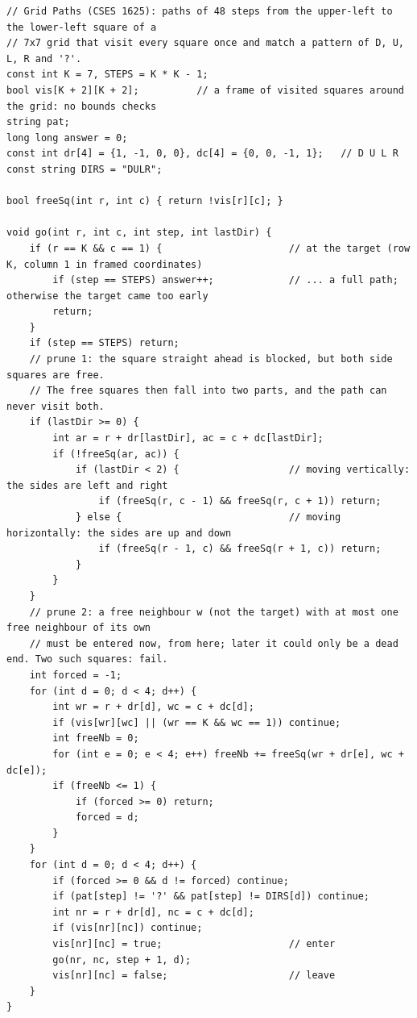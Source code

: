 \begin{solutionbox}
\begin{lstlisting}[style=cpp]
// Grid Paths (CSES 1625): paths of 48 steps from the upper-left to the lower-left square of a
// 7x7 grid that visit every square once and match a pattern of D, U, L, R and '?'.
const int K = 7, STEPS = K * K - 1;
bool vis[K + 2][K + 2];          // a frame of visited squares around the grid: no bounds checks
string pat;
long long answer = 0;
const int dr[4] = {1, -1, 0, 0}, dc[4] = {0, 0, -1, 1};   // D U L R
const string DIRS = "DULR";

bool freeSq(int r, int c) { return !vis[r][c]; }

void go(int r, int c, int step, int lastDir) {
    if (r == K && c == 1) {                      // at the target (row K, column 1 in framed coordinates)
        if (step == STEPS) answer++;             // ... a full path; otherwise the target came too early
        return;
    }
    if (step == STEPS) return;
    // prune 1: the square straight ahead is blocked, but both side squares are free.
    // The free squares then fall into two parts, and the path can never visit both.
    if (lastDir >= 0) {
        int ar = r + dr[lastDir], ac = c + dc[lastDir];
        if (!freeSq(ar, ac)) {
            if (lastDir < 2) {                   // moving vertically: the sides are left and right
                if (freeSq(r, c - 1) && freeSq(r, c + 1)) return;
            } else {                             // moving horizontally: the sides are up and down
                if (freeSq(r - 1, c) && freeSq(r + 1, c)) return;
            }
        }
    }
    // prune 2: a free neighbour w (not the target) with at most one free neighbour of its own
    // must be entered now, from here; later it could only be a dead end. Two such squares: fail.
    int forced = -1;
    for (int d = 0; d < 4; d++) {
        int wr = r + dr[d], wc = c + dc[d];
        if (vis[wr][wc] || (wr == K && wc == 1)) continue;
        int freeNb = 0;
        for (int e = 0; e < 4; e++) freeNb += freeSq(wr + dr[e], wc + dc[e]);
        if (freeNb <= 1) {
            if (forced >= 0) return;
            forced = d;
        }
    }
    for (int d = 0; d < 4; d++) {
        if (forced >= 0 && d != forced) continue;
        if (pat[step] != '?' && pat[step] != DIRS[d]) continue;
        int nr = r + dr[d], nc = c + dc[d];
        if (vis[nr][nc]) continue;
        vis[nr][nc] = true;                      // enter
        go(nr, nc, step + 1, d);
        vis[nr][nc] = false;                     // leave
    }
}


\end{lstlisting}
\end{solutionbox}
